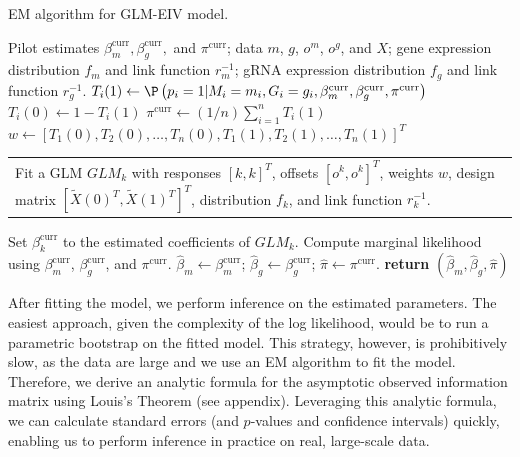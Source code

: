 \documentclass[12pt]{article}
\makeatletter
\newcommand{\multiline}[1]{%
	\begin{tabularx}{\dimexpr\linewidth-\ALG@thistlm}[t]{@{}X@{}}
		#1
	\end{tabularx}
}
\makeatother
\begin{document}
\begin{algorithm}
	\caption{EM algorithm for GLM-EIV model.}\label{algo:em_full}
	\begin{algorithmic}
		\Require Pilot estimates $\beta^\textrm{curr}_m, \beta^\textrm{curr}_g,$ and $\pi^\textrm{curr}$; data $m$, $g$, $o^m$, $o^g$, and $X$; gene expression distribution $f_m$ and link function $r^{-1}_m$; gRNA expression distribution $f_g$ and link function $r^{-1}_g$.  
			 
			\State $T_i(1) \gets \P\left(p_i = 1 |M_i = m_i, G_i = g_i, \beta_m^\textrm{curr}, \beta_g^\textrm{curr}, \pi^\textrm{curr} \right)$
			\State $T_i(0) \gets 1 - T_i(1)$
		 \EndFor
		 \State $\pi^{\textrm{curr}} \gets (1/n) \sum_{i=1}^n T_i(1)$ 
		 \State $w \gets [T_1(0), T_2(0), \dots, T_n(0), T_1(1), T_2(1), \dots, T_n(1)]^T$
		 \State  \multiline{ 
		 	Fit a GLM $GLM_k$ with responses $[k,k]^T$, offsets $[o^k, o^k]^T$, weights $w$, design matrix $[\tilde{X}(0)^T, \tilde{X}(1)^T]^T$, distribution $f_k$, and link function $r^{-1}_k$.
		}
		 \State Set $\beta_k^\textrm{curr}$ to the estimated coefficients of $GLM_k$.
		 \EndFor
		\State Compute marginal likelihood using $\beta_m^\textrm{curr}$, $\beta_g^\textrm{curr}$, and $\pi^\textrm{curr}$.
		\EndWhile
		\State $\hat{\beta}_m \gets \beta_m^\textrm{curr}$; $\hat{\beta}_g \gets \beta_g^\textrm{curr}$; $\hat{\pi} \gets \pi^\textrm{curr}$.
		\State \textbf{return} $(\hat{\beta}_m, \hat{\beta}_g, \hat{\pi})$
	\end{algorithmic}
\end{algorithm}

After fitting the model, we perform inference on the estimated parameters. The easiest approach, given the complexity of the log likelihood, would be to run a parametric bootstrap on the fitted model. This strategy, however, is prohibitively slow, as the data are large and we use an EM algorithm to fit the model. Therefore, we derive an analytic formula for the asymptotic observed information matrix using Louis's Theorem \cite{Louis1982} (see appendix). Leveraging this analytic formula, we can calculate standard errors (and $p$-values and confidence intervals) quickly, enabling us to perform inference in practice on real, large-scale data.
\end{document}
